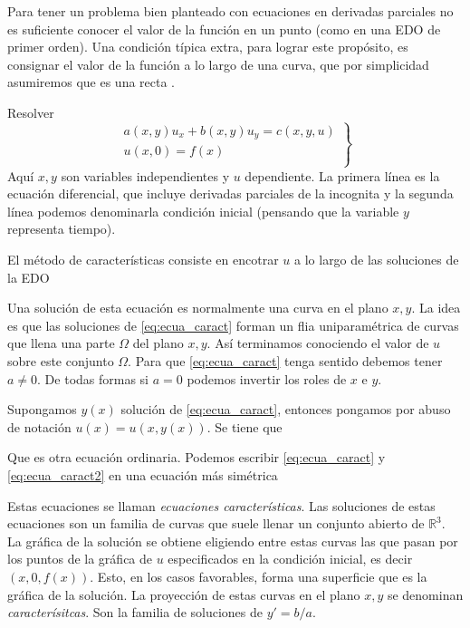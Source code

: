 Para tener un problema bien planteado con  ecuaciones en derivadas parciales no es suficiente conocer el valor de la función en un punto (como en una EDO de primer orden). Una condición típica extra, para lograr este propósito,  es consignar el valor de la función a lo largo de una curva, que por simplicidad asumiremos que es una recta .

\begin{ejemplo} Resolver
\begin{equation}\label{eq:EDP_gral_1orden}
  \left.\begin{array}{l}
  a(x,y)u_x+b(x,y)u_y=c(x,y,u)\\
  u(x,0)=f(x)\\
\end{array}\right\}
\end{equation}
Aquí $x,y$ son variables independientes y $u$ dependiente. La primera línea es la ecuación diferencial, que incluye derivadas parciales de la incognita y la segunda línea podemos denominarla condición inicial (pensando que la variable $y$ representa tiempo).
\end{ejemplo}

El método de características consiste en encotrar $u$ a lo largo de las soluciones de la EDO


Una solución de esta ecuación es normalmente una curva en el plano  $x,y$. La idea es que las soluciones de \eqref{eq:ecua_caract} forman un flia uniparamétrica
 de curvas que llena una parte $\Omega$ del plano $x,y$.  Así terminamos conociendo el valor de $u$ sobre este conjunto $\Omega$. Para que \eqref{eq:ecua_caract} tenga sentido debemos tener $a\neq 0$. De todas formas si $a=0$ podemos invertir los roles de $x$ e $y$.

Supongamos $y(x)$ solución de \eqref{eq:ecua_caract}, entonces pongamos por abuso de notación $u(x)=u(x,y(x))$. Se tiene que

Que es otra ecuación ordinaria. Podemos escribir  \eqref{eq:ecua_caract} y \eqref{eq:ecua_caract2} en una ecuación más simétrica

Estas ecuaciones se llaman \emph{ecuaciones características}. Las soluciones de estas ecuaciones son un familia de curvas que suele llenar un conjunto abierto de  $\mathbb{R}^3$.  La gráfica de la solución se obtiene eligiendo entre estas curvas las que pasan por los puntos de la gráfica de $u$ especificados en la condición inicial, es decir $(x,0,f(x))$. Esto, en los casos favorables, forma una superficie que es la gráfica de la solución. La proyección de estas curvas en el plano $x,y$ se denominan \emph{caracterísitcas}. Son la familia de soluciones de $y'=b/a$.


